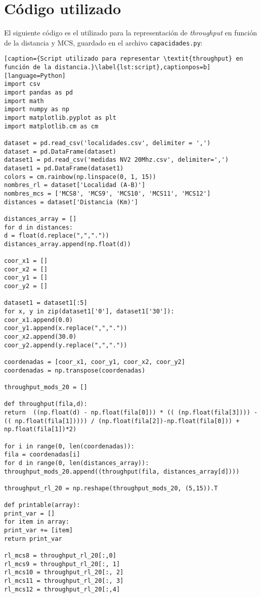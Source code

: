 \section{Código utilizado}
El siguiente código es el utilizado para la representación de \textit{throughput} en función de la distancia  y MCS, guardado en el archivo \texttt{capacidades.py}:
\begin{lstlisting}[caption={Script utilizado para representar \textit{throughput} en función de la distancia.}\label{lst:script},captionpos=b][language=Python]
import csv
import pandas as pd
import math 
import numpy as np
import matplotlib.pyplot as plt
import matplotlib.cm as cm

dataset = pd.read_csv('localidades.csv', delimiter = ',')
dataset = pd.DataFrame(dataset)
dataset1 = pd.read_csv('medidas NV2 20Mhz.csv', delimiter=',')
dataset1 = pd.DataFrame(dataset1)
colors = cm.rainbow(np.linspace(0, 1, 15))
nombres_rl = dataset['Localidad (A-B)']
nombres_mcs = ['MCS8', 'MCS9', 'MCS10', 'MCS11', 'MCS12']
distances = dataset['Distancia (Km)']

distances_array = []
for d in distances:
d = float(d.replace(",","."))
distances_array.append(np.float(d))

coor_x1 = []
coor_x2 = []
coor_y1 = []
coor_y2 = []

dataset1 = dataset1[:5]
for x, y in zip(dataset1['0'], dataset1['30']):
coor_x1.append(0.0)
coor_y1.append(x.replace(",","."))
coor_x2.append(30.0)
coor_y2.append(y.replace(",","."))

coordenadas = [coor_x1, coor_y1, coor_x2, coor_y2]
coordenadas = np.transpose(coordenadas)

throughput_mods_20 = []

def throughput(fila,d):
return  ((np.float(d) - np.float(fila[0])) * (( (np.float(fila[3]))) - (( np.float(fila[1])))) / (np.float(fila[2])-np.float(fila[0])) + np.float(fila[1])*2)

for i in range(0, len(coordenadas)):
fila = coordenadas[i]
for d in range(0, len(distances_array)):
throughput_mods_20.append((throughput(fila, distances_array[d])))

throughput_rl_20 = np.reshape(throughput_mods_20, (5,15)).T

def printable(array):
print_var = []
for item in array:
print_var += [item]
return print_var

rl_mcs8 = throughput_rl_20[:,0]
rl_mcs9 = throughput_rl_20[:, 1]
rl_mcs10 = throughput_rl_20[:, 2]
rl_mcs11 = throughput_rl_20[:, 3]
rl_mcs12 = throughput_rl_20[:,4]


\end{lstlisting}
